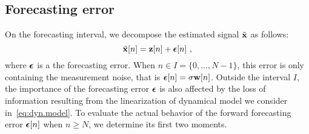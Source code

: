 \subsection{Forecasting error}
On the forecasting interval, we decompose the estimated signal $\tilde{{\mathbf x}}$ as follows:
\begin{equation}
\tilde \bx[n] = \bz[n] + \bepsilon[n]\ ,
\label{eq:forecasting.error}
\end{equation}
where $\boldsymbol{\epsilon}$ is a the forecasting error. When $n\in I=\{0,\dots,N-1\}$, this error is only containing the measurement noise, that is $\boldsymbol{\epsilon}[n]=\sigma{\mathbf w}[n]$. Outside the interval $I$, the importance of the forecasting error $\boldsymbol{\epsilon}$ is also affected by the loss of information resulting from the linearization of dynamical model we consider in~\eqref{eq:dyn.model}. To evaluate the actual behavior of the forward forecasting error $\boldsymbol{\epsilon}[n]$ when $n\geq N$, we determine its first two moments.
